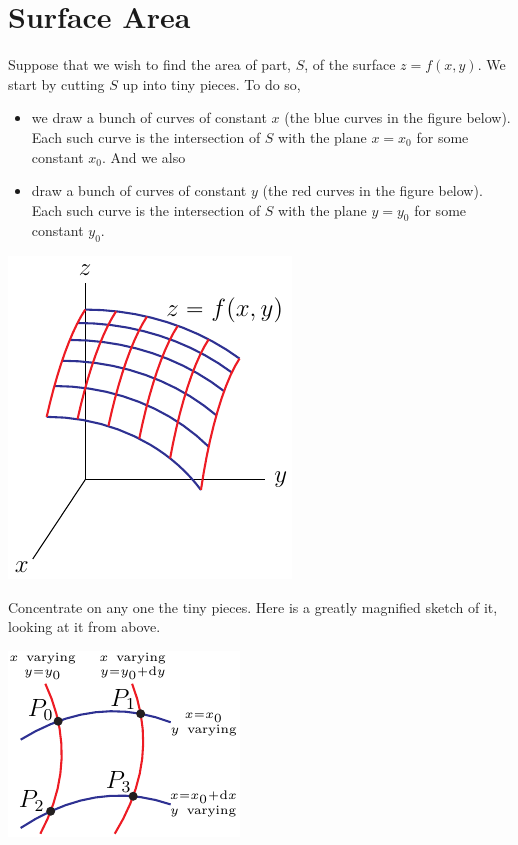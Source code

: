 \section{Surface Area}\label{sec surface area}
Suppose that we wish to find the area of part, $S$, of the surface $z=f(x,y)$. We start by cutting $S$ up into tiny pieces. To do so, 
\begin{itemize}
\item
we draw a bunch of curves of constant $x$ (the blue curves in the
figure below). Each such curve is the intersection of $S$ with 
the plane $x=x_0$ for some constant $x_0$.  And we also 
\item
draw a bunch of curves of constant $y$ (the red curves in the
figure below). Each such curve is the intersection of $S$ with 
the plane $y=y_0$ for some constant $y_0$.
\end{itemize}
\begin{nfig}
\begin{center}
    \includegraphics{sphericaldSxy.pdf}
\end{center}
\end{nfig}
Concentrate on any one the tiny pieces. Here is a greatly magnified
sketch of it, looking at it from above.
\begin{nfig}
\begin{center}
    \includegraphics{dSfxy.pdf}
\end{center}
\end{nfig}
